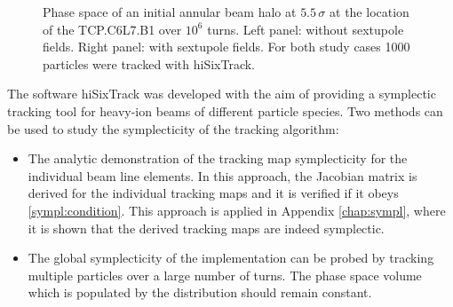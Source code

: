 
\begin{figure}[b]
  \centering
  \caption{Phase space of an initial annular beam halo at $5.5\,\sigma$ at the location of the TCP.C6L7.B1 over $10^6$ turns. Left panel: without sextupole fields. Right panel: with sextupole fields. For both study cases 1000 particles were tracked with hiSixTrack.}  
  \label{pic:16080503}
  \end{figure}

The software hiSixTrack was developed with the aim of providing a symplectic tracking tool for heavy-ion beams of different particle species. Two methods can be used to study the symplecticity of the tracking algorithm:

\begin{itemize}
  \item The analytic demonstration of the tracking map symplecticity for the individual beam line elements. In this approach, the Jacobian matrix is derived for the individual tracking maps and it is verified if it obeys \eqref{sympl:condition}. This approach is applied in Appendix \ref{chap:sympl}, where it is shown that the derived tracking maps are indeed symplectic. 
  \item The global symplecticity of the implementation can be probed by tracking multiple particles over a large number of turns. The phase space volume which is populated by the distribution should remain constant. 
\end{itemize}

